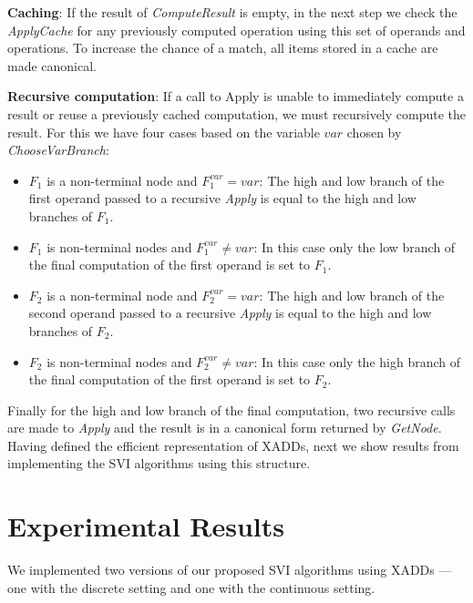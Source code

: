 \documentclass[twoside,11pt]{article}
\begin{document}
\textbf{Caching}:
If the result of 	\emph{ComputeResult} is empty, in the next step we check the  \emph{ApplyCache} for any previously computed operation using this set of operands and operations. To increase the chance of a match, all items stored in a cache are made canonical.

\textbf{Recursive computation}:
If a call to Apply is unable to immediately compute a result or reuse a previously cached computation, we must recursively compute the result. For this we have four cases based on the variable $var$ chosen by \emph{ChooseVarBranch}:
\begin{itemize}
\item $F_1$ is a non-terminal node and $F_1^{var} =var $: The high and low branch of the first operand passed to a recursive \emph{Apply} is equal to the high and low branches of $F_1$. 
\item $F_1$ is non-terminal nodes and $F_1^{var} \neq var $: In this case only the low branch of the final computation of the first operand is set to $F_1$.
\item $F_2$ is a non-terminal node and $F_2^{var} =var $: The high and low branch of the second operand passed to a recursive \emph{Apply} is equal to the high and low branches of $F_2$. 
\item $F_2$ is non-terminal nodes and $F_2^{var} \neq var $: In this case only the high branch of the final computation of the first operand is set to $F_2$.

\end{itemize}

Finally for the high and low branch of the final computation, two recursive calls are made to \emph{Apply} and the result is in a canonical form returned by \emph{GetNode}. 
Having defined the efficient representation of XADDs, next we show results from implementing the SVI algorithms using this structure.

\section{Experimental Results} \label{results}
\vspace*{-0.05in}

We implemented two versions of our proposed SVI algorithms using XADDs
--- one with the discrete setting and one with the continuous setting. 
\end{document}
